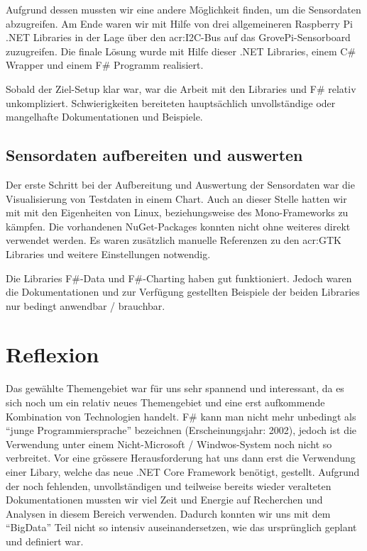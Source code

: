 Aufgrund dessen mussten wir eine andere Möglichkeit finden, um die Sensordaten abzugreifen. Am Ende waren wir mit Hilfe von drei allgemeineren Raspberry Pi .NET Libraries in der Lage über den \gls{acr:I2C}-Bus auf das GrovePi-Sensorboard zuzugreifen. Die finale Lösung wurde mit Hilfe dieser .NET Libraries, einem C\# Wrapper und einem F\# Programm realisiert.

Sobald der Ziel-Setup klar war, war die Arbeit mit den Libraries und F\# relativ unkompliziert. Schwierigkeiten bereiteten hauptsächlich unvollständige oder mangelhafte Dokumentationen und Beispiele.

\subsection{Sensordaten aufbereiten und auswerten}
Der erste Schritt bei der Aufbereitung und Auswertung der Sensordaten war die Visualisierung von Testdaten in einem Chart. Auch an dieser Stelle hatten wir mit mit den Eigenheiten von Linux, beziehungsweise des Mono-Frameworks zu kämpfen. Die vorhandenen NuGet-Packages konnten nicht ohne weiteres direkt verwendet werden. Es waren zusätzlich manuelle Referenzen zu den \gls{acr:GTK} Libraries und weitere Einstellungen notwendig. 

Die Libraries F\#-Data und F\#-Charting haben gut funktioniert. Jedoch waren die Dokumentationen und zur Verfügung gestellten Beispiele der beiden Libraries nur bedingt anwendbar / brauchbar.


\section{Reflexion}
Das gewählte Themengebiet war für uns sehr spannend und interessant, da es sich noch um ein relativ neues Themengebiet und eine erst aufkommende Kombination von Technologien handelt. F\# kann man nicht mehr unbedingt als "`junge Programmiersprache"' bezeichnen (Erscheinungsjahr: 2002), jedoch ist die Verwendung unter einem Nicht-Microsoft / Windwos-System noch nicht so verbreitet. Vor eine grössere Herausforderung hat uns dann erst die Verwendung einer Libary, welche das neue .NET Core Framework benötigt, gestellt. Aufgrund der noch fehlenden, unvollständigen und teilweise bereits wieder veralteten Dokumentationen mussten wir viel Zeit und Energie auf Recherchen und Analysen in diesem Bereich verwenden. Dadurch konnten wir uns mit dem "`BigData"' Teil nicht so intensiv auseinandersetzen, wie das ursprünglich geplant und definiert war.